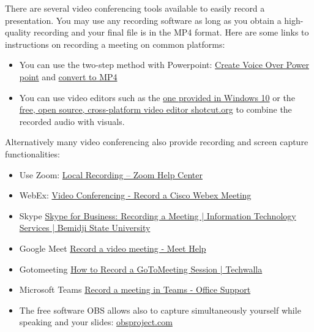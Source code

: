 \documentclass[english,a4paper,11pt,oneside,onecolumn]{article}
\begin{document}
There are several video conferencing tools available to easily record a presentation. You may use any recording software as long as you obtain a high-quality recording and your final file is in the MP4 format. Here are some links to instructions on recording a meeting on common platforms:
\begin{itemize}
    \item You can use the two-step method  with Powerpoint: \href{http://support.office.com/en-us/article/record-a-slide-show-with-narration-and-slide-timings-0b9502c6-5f6c-40ae-b1e7-e47d8741161c}{Create Voice Over Power point} and \href{https://nursing.vanderbilt.edu/knowledge-base/knowledgebase/how-to-save-voppt-to-mp4/}{convert to MP4} 
    \item You can use video editors such as the   
    \href{https://support.microsoft.com/en-us/windows/create-or-edit-video-in-windows-10-53b3e8f8-a85f-172f-4efd-2e66afccf43e}{one provided in Windows 10} or the  \href{https://shotcut.org}{free, open source, cross-platform video editor shotcut.org} to combine the recorded audio with visuals.
\end{itemize}
Alternatively many video conferencing also provide recording and screen capture functionalities: 
\begin{itemize}
    \item Use Zoom: \href{https://support.zoom.us/hc/en-us/articles/201362473-Local-Recording}{Local Recording – Zoom Help Center}
    \item WebEx: \href{https://help.webex.com/en-us/n62735y/Record-a-Cisco-Webex-Meeting}{Video Conferencing - Record a Cisco Webex     Meeting   }
    \item Skype \href{https://www.bemidjistate.edu/offices/its/knowledge-base/skype-for-business-recording-a-meeting/}{Skype for Business: Recording a Meeting | Information Technology Services | Bemidji State University}
    \item Google Meet \href{https://support.google.com/meet/answer/9308681?hl=en}{Record a video meeting - Meet Help}
    \item Gotomeeting \href{https://www.techwalla.com/articles/how-to-record-a-gotomeeting-session}{How to Record a GoToMeeting Session | Techwalla}
    \item Microsoft Teams \href{https://support.office.com/en-us/article/record-a-meeting-in-teams-34dfbe7f-b07d-4a27-b4c6-de62f1348c24}{Record a meeting in Teams - Office Support}
    \item The free software OBS allows also to capture simultaneously yourself while speaking and your slides: 
\href{https://obsproject.com}{obsproject.com}

\end{itemize}
\end{document}
